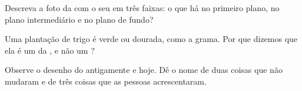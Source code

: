 \begin{exercise}[$\star\star$]\label{exo:g1:landscapes-around-us:9}
Descreva a foto da  com o seu  em três faixas: o que há no
primeiro plano, no plano intermediário e no plano de fundo?
\end{exercise}

\begin{exercise}[$\star\star$]\label{exo:g1:landscapes-around-us:10}
Uma plantação de trigo é verde ou dourada, como a grama. Por que dizemos
que ela é um  da , e não um ?
\end{exercise}

\begin{exercise}[$\star\star$]\label{exo:g1:landscapes-around-us:11}
Observe o desenho do  antigamente e hoje. Dê o nome de duas coisas que
não mudaram e de três coisas que as pessoas acrescentaram.
\end{exercise}
